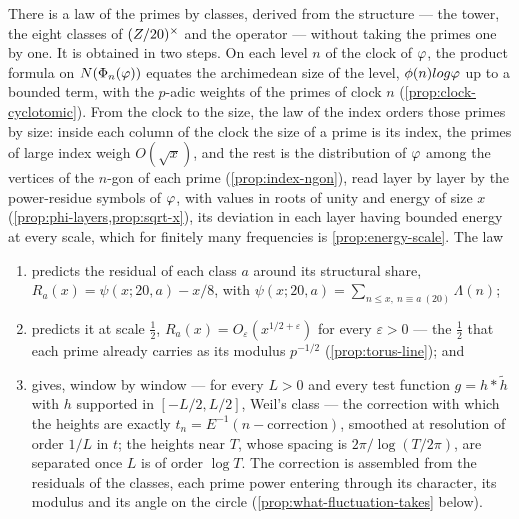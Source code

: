 \begin{conjecture}\label{conj:closure}
There is a law of the primes by classes, derived from
the structure --- the tower, the eight classes of
$(Z/20)^\times$ and the operator --- without taking the
primes one by one.  It is obtained in two steps.  On
each level $n$ of the clock of $\varphi$, the product
formula on $N(\Phi_n(\varphi))$ equates the archimedean
size of the level, $\phi(n)log\varphi$ up to a bounded
term, with the $p$-adic weights
of the primes of clock $n$
(\cref{prop:clock-cyclotomic}).  From the clock to the
size, the law of the index orders those primes by size:
inside each column of the clock the size of a prime is
its index, the primes of large index weigh $O(\sqrt x)$,
and the rest is the distribution of $\varphi$ among the
vertices of the $n$-gon of each prime
(\cref{prop:index-ngon}), read layer by layer by the
power-residue symbols of $\varphi$, with values in roots
of unity and energy of size $x$
(\cref{prop:phi-layers,prop:sqrt-x}), its deviation in
each layer having bounded energy at every scale, which
for finitely many frequencies is \cref{prop:energy-scale}.  The law
\begin{enumerate}[label=\textup{(\roman*)}]
  \item predicts the residual of each class $a$ around its structural share,
    $R_a(x)=\psi(x;20,a)-x/8$, with $\psi(x;20,a)=\sum_{n\le x,\ n\equiv a\ (20)}\Lambda(n)$;
  \item predicts it at scale $\tfrac12$, $R_a(x)=O_\varepsilon(x^{1/2+\varepsilon})$ for every
    $\varepsilon>0$ --- the $\tfrac12$ that each prime already carries as its modulus $p^{-1/2}$
    (\cref{prop:torus-line}); and
  \item gives, window by window --- for every $L>0$ and every test function $g=h*\tilde h$ with
    $h$ supported in $[-L/2,L/2]$, Weil's class --- the correction with which the heights are
    exactly $t_n=E^{-1}(n-\text{correction})$, smoothed at resolution of order $1/L$ in $t$; the
    heights near $T$, whose spacing is $2\pi/\log(T/2\pi)$, are separated once $L$ is of order
    $\log T$.  The correction is assembled from the residuals of the classes, each prime power
    entering through its character, its modulus and its angle on the circle
    (\cref{prop:what-fluctuation-takes} below).
\end{enumerate}
\end{conjecture}
